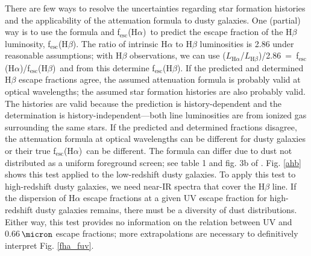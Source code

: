 \documentclass[preprint]{aastex}
\newcommand{\alephha}{f$_{\mathrm{esc}}$(H$\alpha$)}
\newcommand{\alephhb}{f$_{\mathrm{esc}}$(H$\beta$)}
\begin{document}
There are few ways to resolve the uncertainties regarding star formation
histories and the applicability of the \citet{calzetti00} attenuation formula
to dusty galaxies.  One (partial) way is to use the formula and
\alephha~to predict the escape fraction of the H$\beta$ luminosity,
\alephhb.  The ratio of intrinsic
H$\alpha$ to H$\beta$ luminosities is 2.86 under reasonable
assumptions; with H$\beta$ observations, we can use
($L_{\mathrm{H}\alpha}$/$L_{\mathrm{H}\beta}$)/2.86~=~\alephha/\alephhb~and from this
determine \alephhb.  If the predicted and determined H$\beta$ escape fractions
agree, the assumed attenuation formula is probably valid at optical
wavelengths; the assumed star formation histories are also probably valid.
The histories are valid because the prediction is history-dependent and the
determination is history-independent---both line luminosities are from ionized
gas surrounding the same stars.  If
the predicted and determined fractions disagree, the attenuation
formula at optical wavelengths can be different for dusty galaxies
or their true \alephha~can be different.  The formula can differ due to dust
not distributed as a uniform foreground screen; see table 1 and fig. 3b of
\citealt{calzetti01}.  Fig. \ref{ahb}
shows this test applied to the low-redshift dusty galaxies.  To apply this
test to high-redshift dusty galaxies, we need near-IR spectra that cover
the H$\beta$ line.  If the dispersion
of H$\alpha$ escape fractions at a given UV escape fraction for high-redshift
dusty galaxies remains, there must be a diversity of dust
distributions.  Either way, this test provides no information on the relation
between UV and 0.66$\,\micron$ escape fractions; more extrapolations are
necessary to definitively interpret Fig. \ref{fha_fuv}.
\end{document}
